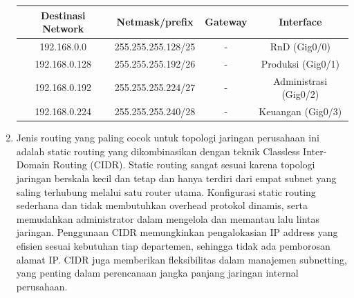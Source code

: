 \begin{enumerate}
	{\small
		\begin{center}
		\begin{tabular}{ |c|c|c|c| } 
			\hline
			Destinasi Network & Netmask/prefix & Gateway & Interface \\
			\hline
			192.168.0.0 & 255.255.255.128/25 & - & RnD (Gig0/0)  \\
			192.168.0.128 & 255.255.255.192/26 & - & Produksi (Gig0/1)  \\
			192.168.0.192 & 255.255.255.224/27 & - & Administrasi (Gig0/2)  \\
			192.168.0.224 & 255.255.255.240/28 & - & Keuangan (Gig0/3)  \\
			\hline
		\end{tabular}
		\end{center}
	}
	\item Jenis routing yang paling cocok untuk topologi jaringan perusahaan ini adalah static routing yang dikombinasikan dengan teknik Classless Inter-Domain Routing (CIDR). Static routing sangat sesuai karena topologi jaringan berskala kecil dan tetap dan hanya terdiri dari empat subnet yang saling terhubung melalui satu router utama. Konfigurasi static routing sederhana dan tidak membutuhkan overhead protokol dinamis, serta memudahkan administrator dalam mengelola dan memantau lalu lintas jaringan. Penggunaan CIDR memungkinkan pengalokasian IP address yang efisien sesuai kebutuhan tiap departemen, sehingga tidak ada pemborosan alamat IP. CIDR juga memberikan fleksibilitas dalam manajemen subnetting, yang penting dalam perencanaan jangka panjang jaringan internal perusahaan.
\end{enumerate}